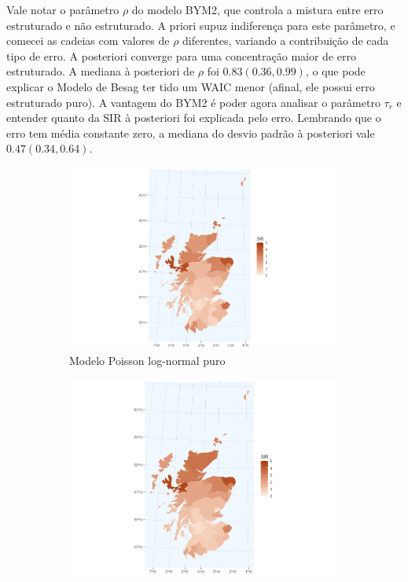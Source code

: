 Vale notar o parâmetro $\rho$ do modelo BYM2, que controla a mistura entre erro estruturado e não estruturado. A priori supuz indiferença para este parâmetro, e comecei as cadeias com valores de $\rho$ diferentes, variando a contribuição de cada tipo de erro. A posteriori converge para uma concentração maior de erro estruturado. A mediana à posteriori de $\rho$ foi $0.83 (0.36,0.99)$, o que pode explicar o Modelo de Besag ter tido um WAIC menor (afinal, ele possui erro estruturado puro). A vantagem do BYM2 é poder agora analisar o parâmetro $\tau_r$ e entender quanto da SIR à posteriori foi explicada pelo erro. Lembrando que o erro tem média constante zero, a mediana do desvio padrão à posteriori vale $0.47 (0.34, 0.64)$. 
\begin{figure}[ht] 
  \begin{subfigure}[b]{0.5\linewidth}
    \centering
    \includegraphics[width=0.9\linewidth]{images/SIR_posteriori_noCAR.png} 
    \caption{Modelo Poisson log-normal puro} 
    \label{fig7:a} 
    \vspace{4ex}
  \end{subfigure}%
  \begin{subfigure}[b]{0.5\linewidth}
    \centering
    \includegraphics[width=0.9\linewidth]{images/SIR_posteriori_CAR.png} 

\end{subfigure}
\end{figure}
